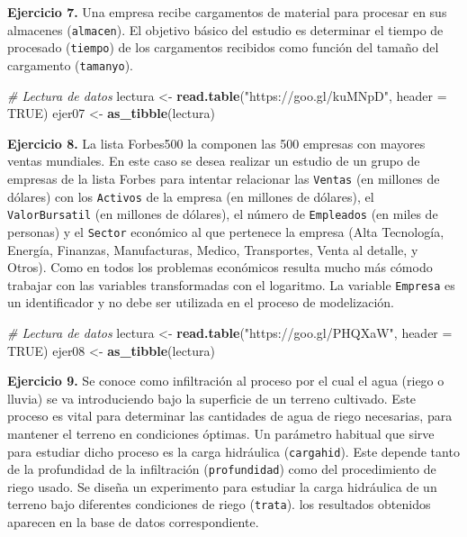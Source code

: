 \documentclass[
]{book}
\newenvironment{Shaded}{\begin{snugshade}}{\end{snugshade}}
\newcommand{\CommentTok}[1]{\textcolor[rgb]{0.56,0.35,0.01}{\textit{#1}}}
\newcommand{\DataTypeTok}[1]{\textcolor[rgb]{0.13,0.29,0.53}{#1}}
\newcommand{\KeywordTok}[1]{\textcolor[rgb]{0.13,0.29,0.53}{\textbf{#1}}}
\newcommand{\NormalTok}[1]{#1}
\newcommand{\OtherTok}[1]{\textcolor[rgb]{0.56,0.35,0.01}{#1}}
\newcommand{\StringTok}[1]{\textcolor[rgb]{0.31,0.60,0.02}{#1}}
\theoremstyle{definition}
\theoremstyle{definition}
\theoremstyle{definition}
\theoremstyle{remark}
\begin{document}
\textbf{Ejercicio 7.} Una empresa recibe cargamentos de material para procesar en sus almacenes (\texttt{almacen}). El objetivo básico del estudio es determinar el tiempo de procesado (\texttt{tiempo}) de los cargamentos recibidos como función del tamaño del cargamento (\texttt{tamanyo}).

\begin{Shaded}
\begin{Highlighting}[]
\CommentTok{# Lectura de datos}
\NormalTok{lectura <-}\StringTok{ }\KeywordTok{read.table}\NormalTok{(}\StringTok{"https://goo.gl/kuMNpD"}\NormalTok{, }\DataTypeTok{header =} \OtherTok{TRUE}\NormalTok{) }
\NormalTok{ejer07 <-}\StringTok{ }\KeywordTok{as_tibble}\NormalTok{(lectura) }
\end{Highlighting}
\end{Shaded}

\textbf{Ejercicio 8.} La lista Forbes500 la componen las 500 empresas con mayores ventas mundiales. En este caso se desea realizar un estudio de un grupo de empresas de la lista Forbes para intentar relacionar las \texttt{Ventas} (en millones de dólares) con los \texttt{Activos} de la empresa (en millones de dólares), el \texttt{ValorBursatil} (en millones de dólares), el número de \texttt{Empleados} (en miles de personas) y el \texttt{Sector} económico al que pertenece la empresa (Alta Tecnología, Energía, Finanzas, Manufacturas, Medico, Transportes, Venta al detalle, y Otros). Como en todos los problemas económicos resulta mucho más cómodo trabajar con las variables transformadas con el logaritmo. La variable \texttt{Empresa} es un identificador y no debe ser utilizada en el proceso de modelización.

\begin{Shaded}
\begin{Highlighting}[]
\CommentTok{# Lectura de datos}
\NormalTok{lectura <-}\StringTok{ }\KeywordTok{read.table}\NormalTok{(}\StringTok{"https://goo.gl/PHQXaW"}\NormalTok{, }\DataTypeTok{header =} \OtherTok{TRUE}\NormalTok{) }
\NormalTok{ejer08 <-}\StringTok{ }\KeywordTok{as_tibble}\NormalTok{(lectura) }
\end{Highlighting}
\end{Shaded}

\textbf{Ejercicio 9.} Se conoce como infiltración al proceso por el cual el agua (riego o lluvia) se va introduciendo bajo la superficie de un terreno cultivado. Este proceso es vital para determinar las cantidades de agua de riego necesarias, para mantener el terreno en condiciones óptimas. Un parámetro habitual que sirve para estudiar dicho proceso es la carga hidráulica (\texttt{cargahid}). Este depende tanto de la profundidad de la infiltración (\texttt{profundidad}) como del procedimiento de riego usado. Se diseña un experimento para estudiar la carga hidráulica de un terreno bajo diferentes condiciones de riego (\texttt{trata}). los resultados obtenidos aparecen en la base de datos correspondiente.
\end{document}

